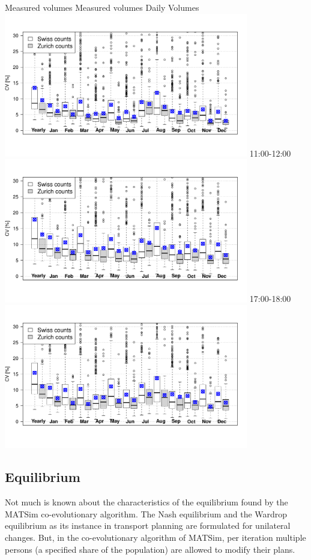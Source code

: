 \createfigure%
{Measured volumes}%
{Measured volumes}%
{\label{fig:counts}}%
{%
	\createsubfigure%
  {Daily Volumes}%
	{\includegraphics[width=0.8\textwidth]{understanding/figures/var/countsDaily.pdf}}%
	{\label{fig:countsDaily}}%
  {}%
  \createsubfigure%
  {11:00-12:00}%
	{\includegraphics[width=0.8\textwidth]{understanding/figures/var/counts11-12.pdf}}%
	{\label{fig:H1112}}%
  {}%
 	\createsubfigure%
  {17:00-18:00}%
	{\includegraphics[width=0.8\textwidth]{understanding/figures/var/counts17-18.pdf}}%
	{\label{fig:H1718}}%
  {}%
}%
{}

\subsection{Equilibrium}
\label{sec:matsimeq}
Not much is known about the characteristics of the equilibrium found by the MATSim co-evolutionary algorithm. The Nash equilibrium and the Wardrop equilibrium as its instance in transport planning are formulated for unilateral changes. But, in the co-evolutionary algorithm of MATSim, per iteration multiple persons (a specified share of the population) are allowed to modify their plans.

